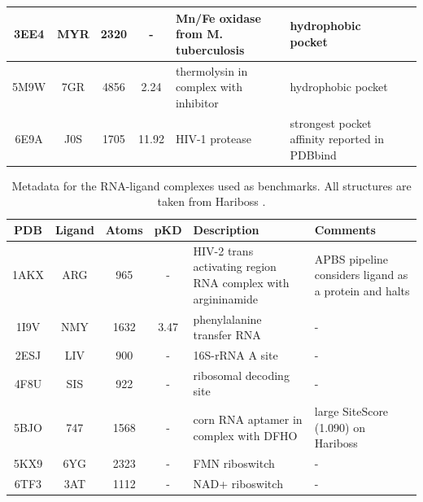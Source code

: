 \begin{table}[H]
\begin{tabular}{ccccp{1.5in}p{1.5in}c}
      3EE4 & MYR     & 2320  & -     & Mn/Fe oxidase from M. tuberculosis         & hydrophobic pocket                            & \cite{benchmark_hydrophobic_2009}        \\ \hline
      5M9W & 7GR     & 4856  & 2.24  & thermolysin in complex with inhibitor      & hydrophobic pocket                            & \cite{hydrophobic_2017}                  \\ \hline
      6E9A & J0S     & 1705  & 11.92 & HIV-1 protease                             & strongest pocket affinity reported in PDBbind & \cite{benchmark_6e9a_2018, pdbbind_2004} \\ \hline
    \end{tabular}
  \end{table}

  \begin{table}[H]
    \caption{\label{tab:appx1/benchmark_rna} Metadata for the RNA-ligand complexes used as benchmarks. All structures are taken from Hariboss \cite{hariboss_2022}.}
    \centering
    \begin{tabular}{ccccp{1.5in}p{1.5in}}
      \hline
      PDB  & Ligand  & Atoms & pKD  & Description                                                 & Comments                                                \\ \hline
      1AKX & ARG     & 965   & -    & HIV-2 trans activating region RNA complex with argininamide & APBS pipeline considers ligand as a protein and halts   \\ \hline
      1I9V & NMY     & 1632  & 3.47 & phenylalanine transfer RNA                                  & -                                                       \\ \hline
      2ESJ & LIV     & 900   & -    & 16S-rRNA A site                                             & -                                                       \\ \hline
      4F8U & SIS     & 922   & -    & ribosomal decoding site                                     & -                                                       \\ \hline
      5BJO & 747     & 1568  & -    & corn RNA aptamer in complex with DFHO                       & large SiteScore (1.090) on Hariboss                     \\ \hline
      5KX9 & 6YG     & 2323  & -    & FMN riboswitch                                              & -                                                       \\ \hline
      6TF3 & 3AT     & 1112  & -    & NAD+ riboswitch                                             & -                                                       \\ \hline

\end{tabular}
\end{table}

